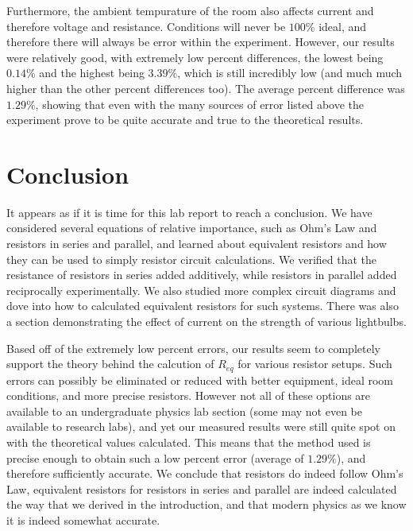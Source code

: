 \documentclass{article}
\theoremstyle{definition}
\begin{document}
Furthermore, the ambient tempurature of the room also affects current and therefore voltage and resistance. Conditions will never be 
$100\%$ ideal, and therefore there will always be error within the experiment. However, our results were relatively good, with extremely low percent differences,
the lowest being $0.14\%$ and the highest being $3.39\%$, which is still incredibly low (and much much higher than the other percent differences too). 
The average percent difference was $1.29\%$, showing that even with the many sources of error listed above the experiment prove to be quite accurate and true to the 
theoretical results. 
\section{Conclusion}
It appears as if it is time for this lab report to reach a conclusion. We have considered several equations of relative importance, such
as Ohm's Law and resistors in series and parallel, and learned about equivalent resistors and how they can be used to simply resistor circuit
calculations. We verified that the resistance of resistors in series added additively, while 
resistors in parallel added reciprocally experimentally. We also studied more complex circuit diagrams and dove into how to calculated equivalent resistors for such systems.
There was also a section demonstrating the effect of current on the strength of various lightbulbs.


Based off of the extremely low percent errors, our results seem to completely support the theory behind the calcution of $R_{eq}$ for
various resistor setups. Such errors can possibly be eliminated or reduced with better equipment, ideal room conditions, and more precise resistors. 
However not all of these options are available to an undergraduate physics lab section (some may not even be available to research labs), and yet our measured results were
still quite spot on with the theoretical values calculated. This means that the method used is precise enough to obtain such a low percent error (average of $1.29\%$), and therefore
sufficiently accurate. We conclude that resistors do indeed follow Ohm's Law, equivalent resistors for resistors in series and parallel are indeed calculated the way that we derived in the introduction,
and that modern physics as we know it is indeed somewhat accurate.
\end{document}
